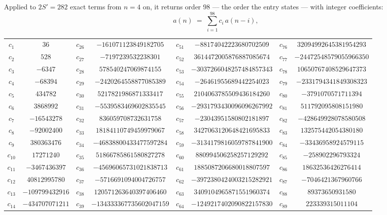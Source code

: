 \documentclass[11pt,a4paper]{article}
\theoremstyle{plain}
\theoremstyle{definition}
\begin{document}
Applied to $2S'=282$ exact terms from $n=4$ on, it returns order $98$ --- the
order the entry states --- with integer coefficients:
\[
a(n)\;=\;\sum_{i=1}^{98}c_i\,a(n-i),
\]
\begin{center}\small
\begin{tabular}{cccccccc}
$c_{1}$ & $36$ & $c_{26}$ & $-161071123849182705$ & $c_{51}$ & $-88174042223680702509$ & $c_{76}$ & $32094992645381954293$ \\
$c_{2}$ & $528$ & $c_{27}$ & $-7197239532238301$ & $c_{52}$ & $3614472005876887085674$ & $c_{77}$ & $-24472548579055966350$ \\
$c_{3}$ & $-6347$ & $c_{28}$ & $578540247069874155$ & $c_{53}$ & $-3037266048257484857343$ & $c_{78}$ & $10650767408529647373$ \\
$c_{4}$ & $-68394$ & $c_{29}$ & $-2420264558877085389$ & $c_{54}$ & $-26461955689442254023$ & $c_{79}$ & $-2331794341849308323$ \\
$c_{5}$ & $434782$ & $c_{30}$ & $5217821986871333417$ & $c_{55}$ & $2104063785509436184260$ & $c_{80}$ & $-3791070571711394$ \\
$c_{6}$ & $3868992$ & $c_{31}$ & $-5539583469602835545$ & $c_{56}$ & $-2931793430096096267992$ & $c_{81}$ & $511792095808151980$ \\
$c_{7}$ & $-16543278$ & $c_{32}$ & $836059708732631758$ & $c_{57}$ & $-23043951580802181897$ & $c_{82}$ & $-428649928078580508$ \\
$c_{8}$ & $-92002400$ & $c_{33}$ & $18184110749459979067$ & $c_{58}$ & $3427063120648421695833$ & $c_{83}$ & $132575442054380180$ \\
$c_{9}$ & $380363476$ & $c_{34}$ & $-46838800433477597284$ & $c_{59}$ & $-3134179816059787841900$ & $c_{84}$ & $-33436958924579115$ \\
$c_{10}$ & $17271240$ & $c_{35}$ & $51866785861580827278$ & $c_{60}$ & $880994506258257129292$ & $c_{85}$ & $-258902296793324$ \\
$c_{11}$ & $-3467436397$ & $c_{36}$ & $-45696065731021838713$ & $c_{61}$ & $1885087206680018807597$ & $c_{86}$ & $18632536426276414$ \\
$c_{12}$ & $40812995780$ & $c_{37}$ & $-5716691094004726757$ & $c_{62}$ & $-3972380424003215282921$ & $c_{87}$ & $-7046421367960766$ \\
$c_{13}$ & $-109799432916$ & $c_{38}$ & $120571263640397406460$ & $c_{63}$ & $3409104965871551960374$ & $c_{88}$ & $89373650931580$ \\
$c_{14}$ & $-434707071211$ & $c_{39}$ & $-134333367735602047159$ & $c_{64}$ & $-1249217402090822157830$ & $c_{89}$ & $223339315011104$ \\

\end{tabular}
\end{center}
\end{document}
